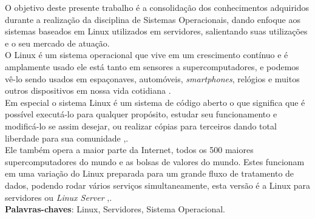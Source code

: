 
\setlength{\absparsep}{18pt} %
\begin{resumo}
    O objetivo deste presente trabalho é a consolidação dos conhecimentos adquiridos durante a realização da disciplina de Sistemas Operacionais, dando enfoque aos sistemas baseados em Linux utilizados em servidores, salientando suas utilizações e o seu mercado de atuação. \\
    O Linux é um sistema operacional que vive em um crescimento contínuo e é amplamente usado ele está tanto em sensores a supercomputadores, e podemos vê-lo sendo usados em espaçonaves, automóveis, \emph{smartphones}, relógios e muitos outros dispositivos em nossa vida cotidiana \cite{LinuxFundationWIL}.\\
    Em especial o sistema Linux é um sistema de código aberto o que significa que é possível executá-lo para qualquer propósito, estudar seu funcionamento e modificá-lo se assim desejar, ou realizar cópias para terceiros dando total liberdade para sua comunidade \cite{LinuxFundationWIL},\cite{Morimoto2011}.\\
    Ele também opera a maior parte da Internet, todos os 500 maiores supercomputadores do mundo e as bolsas de valores do mundo. Estes funcionam em uma variação do Linux preparada para um grande fluxo de tratamento de dados, podendo rodar vários serviços simultaneamente, esta versão é a Linux para servidores ou \emph{Linux Server} \cite{LinuxFundationWIL},\cite{Morimoto2011}.\\





 \textbf{Palavras-chaves}: Linux, Servidores, Sistema Operacional.
\end{resumo}


 
